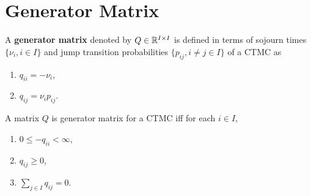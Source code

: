 \documentclass[a4paper,10pt,english]{article}
\begin{document}
\section{Generator Matrix}
\begin{defn}
A \textbf{generator matrix} denoted by $Q \in \mathbb{R}^{I \times I}$ is defined in terms of sojourn times $\{\nu_i, i \in I\}$ and jump transition probabilities $\{p_{ij}, i \neq j \in I\}$ of a CTMC as
\begin{enumerate}
\item $q_{ii}= -\nu_i$,
\item $q_{ij}=\nu_i p_{ij}$. 
\end{enumerate}
\end{defn}
\begin{lem} A matrix $Q$ is generator matrix for a CTMC iff for each $i \in I$,
 \begin{enumerate}
\item $0 \leq -q_{ii} < \infty$, 
\item $q_{ij} \geq 0$,
\item $\sum_{j \in I}q_{ij}=0$.
\end{enumerate}
\end{lem}
\end{document}
